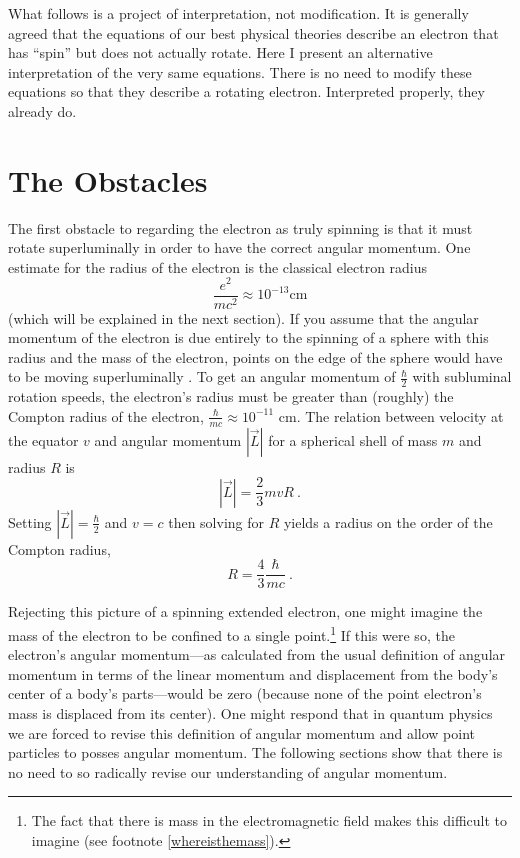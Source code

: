 \documentclass[12pt,secnumarabic,amsmath,amssymb,balancelastpage,nofootinbib]{article}
\begin{document}
What follows is a project of interpretation, not modification.  It is generally agreed that the equations of our best physical theories describe an electron that has ``spin'' but does not actually rotate.  Here I present an alternative interpretation of the very same equations.  There is no need to modify these equations so that they describe a rotating electron.  Interpreted properly, they already do.

\section{The Obstacles}\label{obstacles}

The first obstacle to regarding the electron as truly spinning is that it must rotate superluminally in order to have the correct angular momentum.  One estimate for the radius of the electron is the classical electron radius 
$$\frac{e^2}{m c^2}\approx10^{-13}\mbox{cm}$$
(which will be explained in the next section).  If you assume that the angular momentum of the electron is due entirely to the spinning of a sphere with this radius and the mass of the electron, points on the edge of the sphere would have to be moving superluminally \citep[problem 4.25]{griffithsQM}.  To get an angular momentum of $\frac{\hbar}{2}$ with subluminal rotation speeds, the electron's radius must be greater than (roughly) the Compton radius of the electron, $\frac{\hbar}{m c}\approx10^{-11}\mbox{ cm}$.  The relation between velocity at the equator $v$ and angular momentum $|\vec{L}|$ for a spherical shell of mass $m$ and radius $R$ is
\begin{equation}
|\vec{L}| = \frac{2}{3}m v R\ .
\end{equation}
Setting $|\vec{L}| = \frac{\hbar}{2}$ and $v=c$ then solving for $R$ yields a radius on the order of the Compton radius,
\begin{equation}
R=\frac{4}{3}\frac{\hbar}{m c}\ .
\end{equation}

Rejecting this picture of a spinning extended electron, one might imagine the mass of the electron to be confined to a single point.\footnote{The fact that there is mass in the electromagnetic field makes this difficult to imagine (see footnote \ref{whereisthemass}).}  If this were so, the electron's angular momentum---as calculated from the usual definition of angular momentum in terms of the linear momentum and displacement from the body's center of a body's parts---would be zero (because none of the point electron's mass is displaced from its center).  One might respond that in quantum physics we are forced to revise this definition of angular momentum and allow point particles to posses angular momentum.  The following sections show that there is no need to so radically revise our understanding of angular momentum.
\end{document}
